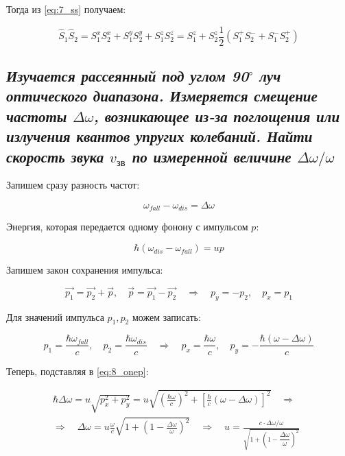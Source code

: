\documentclass[a4paper, 12pt]{article}
\newcommand{\qrq}
{\ensuremath{\quad \Rightarrow \quad}} %
\begin{document}
Тогда из \ref{eq:7_ss} получаем:

\begin{equation}
	\hat{S}_1 \hat{S}_2 = S_1^x S_2^x + S_1^y S_2^y + S_1^z S_2^z = S_1^z + S_2^z  \frac{1}{2} (S_1^+S_2^- + S_1^-S_2^+)
\end{equation}


\newpage

\subsection{\textit{Изучается рассеянный под углом 90$^\circ$ луч оптического диапазона. Измеряется смещение частоты $\Delta \omega$, возникающее из-за поглощения или излучения квантов упругих колебаний. Найти скорость звука $v_{\text{зв}}$ по измеренной величине $\Delta \omega / \omega$}}

Запишем сразу разность частот:

\begin{equation}
	\omega_{fall} - \omega_{dis} = \Delta \omega
\end{equation}

Энергия, которая передается одному фонону с импульсом $p$:

\begin{equation}
	\hbar (\omega_{dis} - \omega_{fall}) = u p
	\label{eq:8_onep}
\end{equation}

Запишем закон сохранения импульса:

\begin{equation}
	\vec{p_1} = \vec{p_2} + \vec{p}, \quad \vec{p} = \vec{p_1} - \vec{p_2} \qrq p_y = -p_2, \quad p_x = p_1
\end{equation}

Для значений импульса $p_1, p_2$ можем записать:

\begin{equation}
	p_1 = \frac{\hbar \omega_{fall}}{c}, \quad p_2 = \frac{\hbar \omega_{dis}}{c} \qrq p_x = \frac{\hbar \omega}{c}, \quad p_y = -\frac{\hbar (\omega - \Delta \omega)}{c}
\end{equation}

Теперь, подставляя в \ref{eq:8_onep}:

\begin{align*}
	\hbar\Delta \omega = u \sqrt{p_x^2 + p_y^2} = u \sqrt{\left(\frac{\hbar\omega}{c}\right)^2 + \left[\frac{\hbar}{c}(\omega - \Delta \omega)\right]^2} \qrq \\
	\Rightarrow \quad \Delta \omega = u \frac{\omega}{c} \sqrt{1 + \left(1 - \frac{\Delta\omega}{\omega}\right)^2} \qrq u = \frac{c \cdot \Delta\omega / \omega}{\sqrt{1 + \left(1 - \dfrac{\Delta\omega}{\omega}\right)^2}}
\end{align*}

\newpage



\begin{thebibliography}{}
	
\end{thebibliography}
\end{document}
